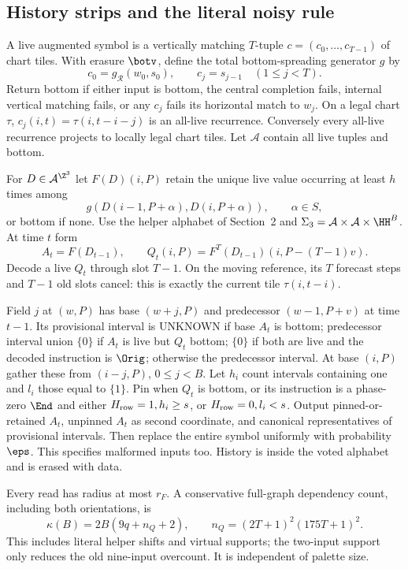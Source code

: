 \subsection{History strips and the literal noisy rule}

A live augmented symbol is a vertically matching $T$-tuple $c=(c_0,\ldots,c_{T-1})$ of chart tiles. With erasure $\botv$, define the total bottom-spreading generator $g$ by
\[
 c_0=g_{\mathcal R}(w_0,s_0),\qquad c_j=s_{j-1}\quad(1\le j<T).
\]
Return bottom if either input is bottom, the central completion fails, internal vertical matching fails, or any $c_j$ fails its horizontal match to $w_j$. On a legal chart $\tau$, $c_j(i,t)=\tau(i,t-i-j)$ is an all-live recurrence. Conversely every all-live recurrence projects to locally legal chart tiles. Let $\mathcal A$ contain all live tuples and bottom.

For $D\in\mathcal A^{\Z^3}$ let $F(D)(i,P)$ retain the unique live value occurring at least $h$ times among
\[
 g(D(i-1,P+\alpha),D(i,P+\alpha)),\qquad\alpha\in S,
\]
or bottom if none. Use the helper alphabet of Section~2 and $\Sigma_3=\mathcal A\times\mathcal A\times\HH^B$. At time $t$ form
\[
 A_t=F(D_{t-1}),\qquad Q_t(i,P)=F^T(D_{t-1})(i,P-(T-1)v).
\]
Decode a live $Q_t$ through slot $T-1$. On the moving reference, its $T$ forecast steps and $T-1$ old slots cancel: this is exactly the current tile $\tau(i,t-i)$.

Field $j$ at $(w,P)$ has base $(w+j,P)$ and predecessor $(w-1,P+v)$ at time $t-1$. Its provisional interval is UNKNOWN if base $A_t$ is bottom; predecessor interval union $\{0\}$ if $A_t$ is live but $Q_t$ bottom; $\{0\}$ if both are live and the decoded instruction is $\Orig$; otherwise the predecessor interval. At base $(i,P)$ gather these from $(i-j,P)$, $0\le j<B$. Let $h_i$ count intervals containing one and $l_i$ those equal to $\{1\}$. Pin when $Q_t$ is bottom, or its instruction is a phase-zero $\End$ and either $H_{\rm row}=1,h_i\ge s$, or $H_{\rm row}=0,l_i<s$. Output pinned-or-retained $A_t$, unpinned $A_t$ as second coordinate, and canonical representatives of provisional intervals. Then replace the entire symbol uniformly with probability $\eps$. This specifies malformed inputs too. History is inside the voted alphabet and is erased with data.

Every read has radius at most $r_F$. A conservative full-graph dependency count, including both orientations, is
\begin{equation}\label{eq:three-degree}
 \kappa(B)=2B(9q+n_Q+2),\qquad n_Q=(2T+1)^2(175T+1)^2.
\end{equation}
This includes literal helper shifts and virtual supports; the two-input support only reduces the old nine-input overcount. It is independent of palette size.

